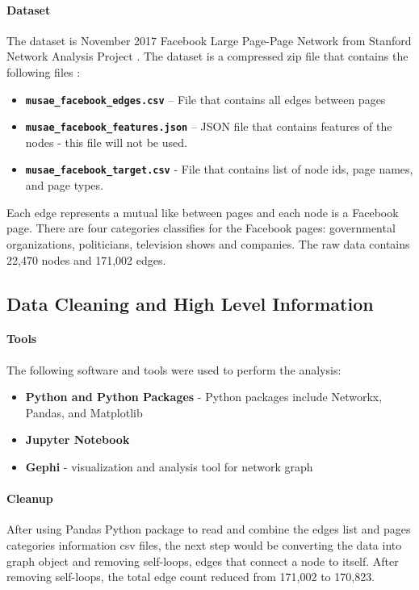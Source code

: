 \documentclass[11pt,twocolumn]{article}
\begin{document}
\paragraph{Dataset \cite{page-page-network-ds}}
The dataset is November 2017 Facebook Large Page-Page Network from Stanford Network Analysis Project \cite{page-page-network-ds}. The dataset is a compressed zip file that contains the following files :
\begin{itemize}
\item\textbf{\texttt{musae\_facebook\_edges.csv}} – File that contains all edges between pages
\item\textbf{\texttt{musae\_facebook\_features.json}} – JSON file that contains features of the nodes - this file will not be used.
\item\textbf{\texttt{musae\_facebook\_target.csv}} - File that contains list of node ids, page names, and page types.
\end{itemize}

Each edge represents a mutual like between pages and each node is a Facebook page. There are four categories classifies for the Facebook pages: governmental organizations, politicians, television shows and companies. The raw data contains 22,470 nodes and 171,002 edges. 

\subsection{Data Cleaning and High Level Information}

\paragraph{Tools}
The following software and tools were used to perform the analysis:
\begin{itemize}
\item \textbf{Python and Python Packages} - Python packages include Networkx, Pandas, and Matplotlib
\item \textbf{Jupyter Notebook}
\item \textbf{Gephi} - visualization and analysis tool for network graph
\end{itemize}

\paragraph{Cleanup}
After using Pandas Python package to read and combine the edges list and pages categories information csv files, the next step would be converting the data into graph object and removing self-loops, edges that connect a node to itself. After removing self-loops, the total edge count reduced from 171,002 to 170,823.
\end{document}
